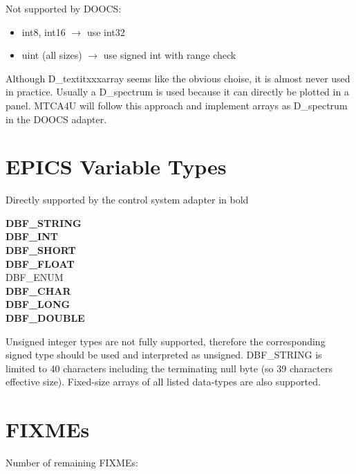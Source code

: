 \documentclass[11pt,a4paper]{scrartcl}
\newcounter{nFixmes}
\begin{document}
Not supported by DOOCS:
\begin{itemize}
\item int8, int16 $\rightarrow$ use int32
\item uint (all sizes) $\rightarrow$ use signed int with range check
\end{itemize}

Although D\_textit{xxx}array seems like the obvious choise, it is almost never used in practice.
Usually a D\_spectrum is used because it can directly be plotted in a panel. MTCA4U
will follow this approach and implement arrays as D\_spectrum in the DOOCS adapter.

\section{EPICS Variable Types}
Directly supported by the control system adapter in bold
\begin{multicols}{3}
\noindent \textbf{DBF\_STRING}\\
\textbf{DBF\_INT}\\
\textbf{DBF\_SHORT}\\
\textbf{DBF\_FLOAT}\\
DBF\_ENUM\\
\textbf{DBF\_CHAR}\\
\textbf{DBF\_LONG}\\
\textbf{DBF\_DOUBLE}
\end{multicols}

Unsigned integer types are not fully supported, therefore the corresponding
signed type should be used and interpreted as unsigned. DBF\_STRING is
limited to 40 characters including the terminating null byte (so 39
characters effective size). Fixed-size arrays of all listed data-types
are also supported.

\section{FIXMEs}
Number of remaining FIXMEs: 
\end{document}
